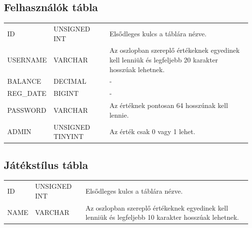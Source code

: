 \subsection{Felhasználók tábla}
\begin{tabular}{| C{4.7cm} | C{4.7cm} | C{4.7cm} |}
\hline
   &  &  \\ \hline
  ID & UNSIGNED INT & Elsődleges kulcs a táblára nézve. \\ \hline
  USERNAME & VARCHAR & Az oszlopban szereplő értékeknek egyedinek kell lenniük és legfeljebb 20 karakter hosszúak lehetnek.  \\ \hline
  BALANCE & DECIMAL & - \\ \hline
  REG\_DATE & BIGINT & - \\ \hline
  PASSWORD & VARCHAR & Az értéknek pontosan 64 hosszúnak kell lennie. \\ \hline
  ADMIN & UNSIGNED TINYINT & Az érték csak 0 vagy 1 lehet. \\ \hline
\end{tabular}

\subsection{Játékstílus tábla}
\begin{tabular}{| C{4.7cm} | C{4.7cm} | C{4.7cm} |}
\hline
   &  &  \\ \hline
  ID & UNSIGNED INT & Elsődleges kulcs a táblára nézve. \\ \hline
  NAME & VARCHAR & Az oszlopban szereplő értékeknek egyedinek kell lenniük és legfeljebb 10 karakter hosszúak lehetnek.  \\ \hline
\end{tabular}




